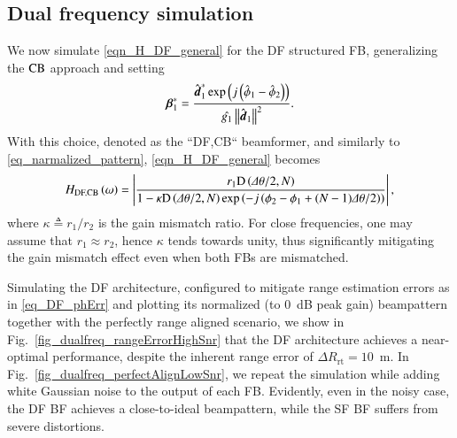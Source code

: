 \subsection{Dual frequency simulation}
We now simulate \eqref{eqn_H_DF_general} for the DF structured FB,
generalizing the $\text{CB}$ approach and setting
\begin{equation*}
    \boldsymbol{\beta}^{*}_{1}=\frac{\hat{\boldsymbol{d}}^{\ast}_{1}\exp\left({j\left({\hat{\phi}_{1}-\hat{\phi}_{2}}\right)}\right)}{\hat{g_{1}}\left\Vert\hat{\boldsymbol{d}}_{1}\right\Vert^2}.
\end{equation*}
With this choice, denoted as the ``DF,CB`` beamformer, and similarly to \eqref{eq_narmalized_pattern}, \eqref{eqn_H_DF_general} becomes
\begin{equation}
    \label{eqn_H_DF_CB}
    {
        \begin{split}
            H_{\text{DF,\text{CB}}}\left({\omega}\right) =
            \left|{\frac{r_{1}\text{D}\left({\Delta\theta/2,N}\right)}{1-
            \kappa\text{D}\left({\Delta\theta/2,N}\right)\exp\left({-j\left({\phi_{2}-\phi_{1}+(N-1)\Delta\theta/2}\right)}\right)}
            }\right|,
        \end{split}
    }
\end{equation}
where $\kappa\triangleq{}r_{1}/r_{2}$ is the gain mismatch ratio.
For close frequencies, one may assume that $r_{1}\approx{}r_{2}$, hence $\kappa$ tends towards unity, thus significantly mitigating the gain mismatch effect even when both FBs are mismatched.
\par Simulating the DF architecture, configured to mitigate range estimation errors as in \eqref{eq_DF_phErr} and plotting its normalized (to $0$~dB peak gain) beampattern together with the perfectly range aligned scenario, we show in Fig.~\ref{fig_dualfreq_rangeErrorHighSnr} that the DF architecture achieves a near-optimal performance, despite the inherent range error of $\Delta{}R_{\text{rt}}=10$~m.
In Fig.~\ref{fig_dualfreq_perfectAlignLowSnr}, we repeat the simulation while adding white Gaussian noise to the output of each FB. Evidently, even in the noisy case, the DF BF achieves a close-to-ideal beampattern, while the SF BF suffers from severe distortions.
